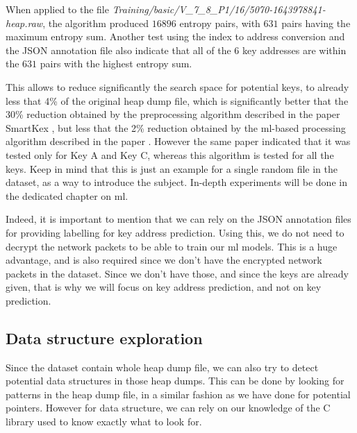     When applied to the file \textit{Training/basic/V\_7\_8\_P1/16/5070-1643978841-heap.raw}, the algorithm produced $ 16896 $ entropy pairs, with $ 631 $ pairs having the maximum entropy sum. Another test using the index to address conversion and the JSON annotation file also indicate that all of the 6 key addresses are within the $ 631 $ pairs with the highest entropy sum.
    
    This allows to reduce significantly the search space for potential keys, to already less that 4\% of the original heap dump file, which is significantly better that the 30\% reduction obtained by the preprocessing algorithm described in the paper SmartKex \cite{SmartKex22}, but less that the 2\% reduction obtained by the \acrshort{ml}-based processing algorithm described in the paper \cite{SmartKex22}. However the same paper indicated that it was tested only for Key A and Key C, whereas this algorithm is tested for all the keys. Keep in mind that this is just an example for a single random file in the dataset, as a way to introduce the subject. In-depth experiments will be done in the dedicated chapter on \acrlong{ml}.

    Indeed, it is important to mention that we can rely on the JSON annotation files for providing labelling for key address prediction. Using this, we do not need to decrypt the network packets to be able to train our \acrshort{ml} models. This is a huge advantage, and is also required since we don't have the encrypted network packets in the dataset. Since we don't have those, and since the keys are already given, that is why we will focus on key address prediction, and not on key prediction.

    \subsection{Data structure exploration}
    Since the dataset contain whole heap dump file, we can also try to detect potential data structures in those heap dumps. This can be done by looking for patterns in the heap dump file, in a similar fashion as we have done for potential pointers. However for data structure, we can rely on our knowledge of the C library used to know exactly what to look for.
    
